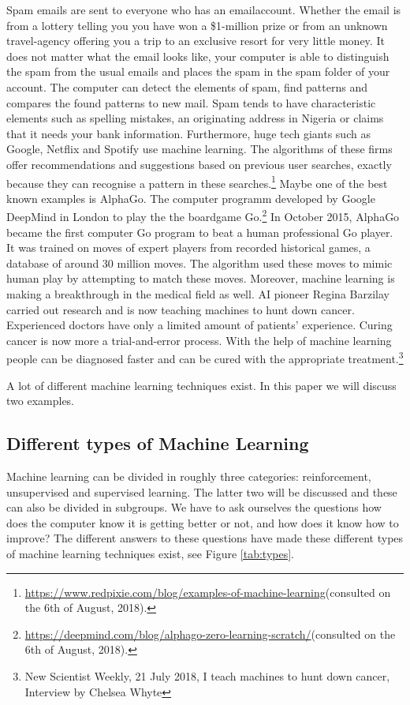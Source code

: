 \documentclass[11pt]{article}
\begin{document}
Spam emails are sent to everyone who has an emailaccount. Whether the email is from a lottery telling you you have won a \$1-million prize or from an unknown travel-agency offering you a trip to an exclusive resort for very little money. It does not matter what the email looks like, your computer is able to distinguish the spam from the usual emails and places the spam in the spam folder of your account. The computer can detect the elements of spam, find patterns and compares the found patterns to new mail. Spam tends to have characteristic elements such as spelling mistakes, an originating address in Nigeria or claims that it needs your bank information. Furthermore, huge tech giants such as Google, Netflix and Spotify use machine learning. The algorithms of these firms offer recommendations and suggestions based on previous user searches, exactly because they can recognise a pattern in these searches.\footnote{\url{https://www.redpixie.com/blog/examples-of-machine-learning}(consulted on the 6th of August, 2018).} Maybe one of the best known examples is AlphaGo. The computer programm developed by Google DeepMind in London to play the the boardgame Go.\footnote{\url{https://deepmind.com/blog/alphago-zero-learning-scratch/}(consulted on the 6th of August, 2018).} In October 2015, AlphaGo became the first computer Go program to beat a human professional Go player. It was trained on moves of expert players from recorded historical games, a database of around 30 million moves. The algorithm used these moves to mimic human play by attempting to match these moves. Moreover, machine learning is making a breakthrough in the medical field as well. AI pioneer Regina Barzilay carried out research and is now teaching machines to hunt down cancer. Experienced doctors have only a limited amount of patients' experience. Curing cancer is now more a trial-and-error process. With the help of machine learning people can be diagnosed faster and can be cured with the appropriate treatment.\footnote{New Scientist Weekly, 21 July 2018, I teach machines to hunt down cancer, Interview by Chelsea Whyte}   

A lot of different machine learning techniques exist. In this paper we will discuss two examples.


\subsection{Different types of Machine Learning}
\label{sec:org608fa9a}
Machine learning can be divided in roughly three categories: reinforcement, unsupervised and supervised learning. The latter two will be discussed and these can also be divided in subgroups. We have to ask ourselves the questions how does the computer know it is getting better or not, and how does it know how to improve? The different answers to these questions have made these different types of machine learning techniques exist, see Figure \ref{tab:types}. 
\end{document}
